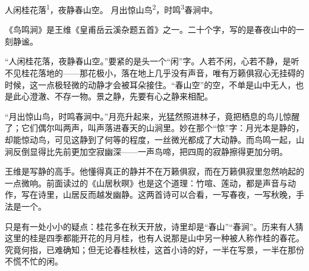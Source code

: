 
\begin{poem}
人闲桂花落\textsuperscript{1}，夜静春山空。
月出惊山鸟\textsuperscript{2}，时鸣\textsuperscript{3}春涧中。
\end{poem}

\begin{annotations}
\end{annotations}

\begin{appreciation}
《鸟鸣涧》是王维《皇甫岳云溪杂题五首》之一。二十个字，写的是春夜山中的一刻静谧。

“人闲桂花落，夜静春山空。”要紧的是头一个“闲”字。人若不闲，心若不静，是听不见桂花落地的——那花极小，落在地上几乎没有声音，唯有万籁俱寂心无挂碍的时候，这一点极轻微的动静才会被耳朵接住。“春山空”的空，不单是山中无人，也是此心澄澈、不存一物。景之静，先要有心之静来相配。

“月出惊山鸟，时鸣春涧中。”月亮升起来，光猛然照进林子，竟把栖息的鸟儿惊醒了；它们偶尔叫两声，叫声落进春天的山涧里。妙在那个“惊”字：月光本是静的，却能惊动鸟，可见这静到了何等的程度，一丝微光都成了大动静。而鸟鸣一起，山涧反倒显得比先前更加空寂幽深——一声鸟啼，把四周的寂静擦得更加分明。

王维是写静的高手。他懂得真正的静并不在万籁俱寂，而在万籁俱寂里忽然响起的一点微响。前面读过的《山居秋暝》也是这个道理：竹喧、莲动，都是声音与动作，写在诗里，山居反而越发幽静。这两首诗可以合看，一写春夜，一写秋晚，手法是一个。

只是有一处小小的疑点：桂花多在秋天开放，诗里却是“春山”“春涧”。历来有人猜这里的桂是四季都能开花的月月桂，也有人说那是山中另一种被人称作桂的春花。究竟何指，已难确知；但无论春桂秋桂，这首小诗的好，一半在写景，一半在那份不慌不忙的闲。
\end{appreciation}
